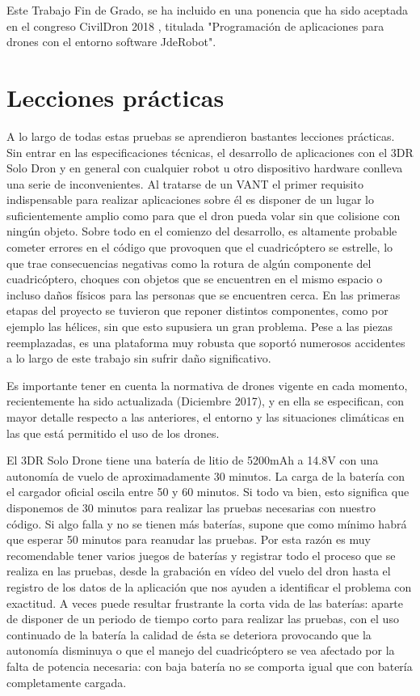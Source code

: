 Este Trabajo Fin de Grado, se ha incluido en una ponencia que ha sido aceptada en el congreso CivilDron 2018 \cite{civilDron}, titulada "Programación de aplicaciones para drones con el entorno software JdeRobot". 

\section{Lecciones prácticas}
A lo largo de todas estas pruebas se aprendieron bastantes lecciones prácticas. Sin entrar en las especificaciones técnicas, el desarrollo de aplicaciones con el 3DR Solo Dron y en general con cualquier robot u otro dispositivo hardware conlleva una serie de inconvenientes. Al tratarse de un VANT el primer requisito indispensable para realizar aplicaciones sobre él es disponer de un lugar lo suficientemente amplio como para que el dron pueda volar sin que colisione con ningún objeto. Sobre todo en el comienzo del desarrollo, es altamente probable cometer errores en el código que provoquen que el cuadricóptero se estrelle, lo que trae consecuencias negativas como la rotura de algún componente del cuadricóptero, choques con objetos que se encuentren en el mismo espacio o incluso daños físicos para las personas que se encuentren cerca. En las primeras etapas del proyecto se tuvieron que reponer distintos componentes, como por ejemplo las hélices, sin que esto supusiera un gran problema. Pese a las piezas reemplazadas, es una plataforma muy robusta que soportó numerosos accidentes a lo largo de este trabajo sin sufrir daño significativo.

Es importante tener en cuenta la normativa de drones vigente en cada momento, recientemente ha sido actualizada (Diciembre 2017), y en ella se especifican, con mayor detalle respecto a las anteriores, el entorno y las situaciones climáticas en las que está permitido el uso de los drones. 

El 3DR Solo Drone tiene una batería de litio de 5200mAh a 14.8V con una autonomía de vuelo de aproximadamente 30 minutos. La carga de la batería con el cargador oficial oscila entre 50 y 60 minutos. Si todo va bien, esto significa que disponemos de 30 minutos para realizar las pruebas necesarias con nuestro código. Si algo falla y no se tienen más baterías, supone que como mínimo habrá que esperar 50 minutos para reanudar las pruebas. Por esta razón es muy recomendable tener varios juegos de baterías y registrar todo el proceso que se realiza en las pruebas, desde la grabación en vídeo del vuelo del dron hasta el registro de los datos de la aplicación que nos ayuden a identificar el problema con exactitud. A veces puede resultar frustrante la corta vida de las baterías: aparte de disponer de un periodo de tiempo corto para realizar las pruebas, con el uso continuado de la batería la calidad de ésta se deteriora provocando que la autonomía disminuya o que el manejo del cuadricóptero se vea afectado por la falta de potencia necesaria: con baja batería no se comporta igual que con batería completamente cargada.

